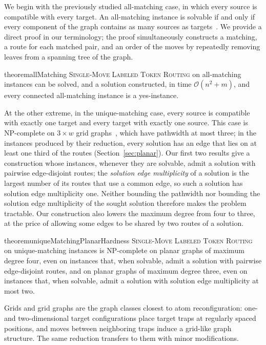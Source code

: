 \documentclass[a4paper,USenglish,thm-restate]{lipics-v2021}
\theoremstyle{problemstyle}
\begin{document}
We begin with the previously studied all-matching case, in which every source is
compatible with every target. An all-matching instance is solvable if and
only if every component of the graph contains as many sources as
targets~\cite{Calinescu2008Reconfigurations}. We provide a direct proof in
our terminology; the proof simultaneously constructs a matching, a route for
each matched pair, and an order of the moves by repeatedly removing leaves
from a spanning tree of the graph.
\begin{restatable}{theorem}{allMatching}
\label{thm:allMatching}
\textsc{Single-Move Labeled Token Routing} on all-matching instances can be
solved, and a solution constructed, in time $\mathcal{O}(n^2+m)$, and every connected all-matching instance
is a yes-instance.
\end{restatable}

At the other extreme, in the unique-matching case, every source is
compatible with exactly one target and every target with exactly one source.
This case is \textsf{NP}-complete on $3\times w$ grid
graphs~\cite{GeftHalperinNakar2024}, which have pathwidth at most three; in the instances produced by their reduction, every solution has an edge that lies on at least one third of the routes (Section~\ref{sec:planar}).
Our first two results give a construction whose instances, whenever they are
solvable, admit a solution with pairwise edge-disjoint routes; the
\emph{solution edge multiplicity} of a solution is the largest number of its
routes that use a common edge, so such a solution has solution edge
multiplicity one. Neither bounding the pathwidth nor
bounding the solution edge multiplicity of the sought solution therefore
makes the problem tractable. Our construction also lowers the maximum degree from four to
three, at the price of allowing some edges to be shared by two routes of a
solution.

\begin{restatable}{theorem}{uniqueMatchingPlanarHardness}
\label{thm:unique_matching_planar_hardness}
\textsc{Single-Move Labeled Token Routing} on unique-matching instances is
\textsf{NP}-complete on planar graphs of maximum degree four, even on
instances that, when solvable, admit a solution with pairwise edge-disjoint
routes, and on planar graphs of maximum degree three, even on instances
that, when solvable, admit a solution with solution edge multiplicity at
most two.
\end{restatable}

Grids and grid graphs are the graph classes closest to atom reconfiguration:
one- and two-dimensional target configurations place target traps at
regularly spaced positions, and moves between neighboring traps induce a
grid-like graph structure. The same reduction transfers to them with minor
modifications.
\end{document}
